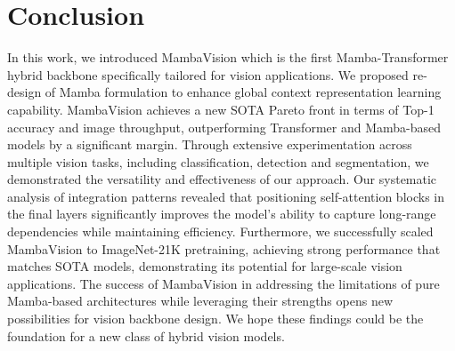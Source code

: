 \documentclass[10pt,twocolumn,letterpaper]{article}
\begin{document}
\section{Conclusion}
In this work, we introduced MambaVision which is the first Mamba-Transformer hybrid backbone specifically tailored for vision applications. We proposed re-design of Mamba formulation to enhance global context representation learning capability. MambaVision achieves a new SOTA Pareto front in terms of Top-1 accuracy and image throughput, outperforming Transformer and Mamba-based models by a significant margin. Through extensive experimentation across multiple vision tasks, including classification, detection and segmentation, we demonstrated the versatility and effectiveness of our approach. Our systematic analysis of integration patterns revealed that positioning self-attention blocks in the final layers significantly improves the model's ability to capture long-range dependencies while maintaining efficiency. Furthermore, we successfully scaled MambaVision to ImageNet-21K pretraining, achieving strong performance that matches SOTA models, demonstrating its potential for large-scale vision applications. The success of MambaVision in addressing the limitations of pure Mamba-based architectures while leveraging their strengths opens new possibilities for vision backbone design. We hope these findings could be the foundation for a new class of hybrid vision models.


{
    \small
    
    
}


\end{document}
